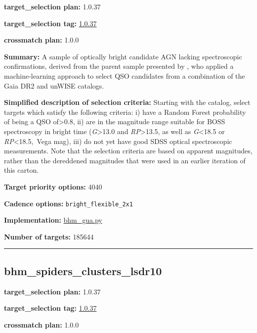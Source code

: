 \noindent\textbf{target\_selection plan:} 1.0.37

\noindent\textbf{target\_selection tag:}
\href{https://github.com/sdss/target_selection/tree/1.0.37/}{1.0.37}

\noindent\textbf{crossmatch plan:} 1.0.0

\noindent\textbf{Summary:} A sample of optically bright candidate AGN lacking
spectroscopic confirmations, derived from the parent sample presented by
\citet{Shu2019}, who applied a machine-learning approach to select QSO
candidates from a combination of the Gaia DR2 and unWISE catalogs.

\noindent\textbf{Simplified description of selection criteria:} Starting with the
\citet{Shu2019} catalog, select targets which satisfy the following
criteria: i) have a Random Forest probability of being a QSO
of\textgreater0.8, ii) are in the magnitude range suitable for BOSS
spectroscopy in bright time (\emph{G}\textgreater13.0 and
\emph{RP}\textgreater13.5, as well as \emph{G}\textless18.5 or
\emph{RP}\textless18.5,~Vega mag), iii) do not yet have good SDSS
optical spectroscopic measurements. Note that the selection criteria are
based on apparent magnitudes, rather than the dereddened magnitudes that
were used in an earlier iteration of this carton.


\noindent\textbf{Target priority options:} 4040

\noindent\textbf{Cadence options:} \texttt{bright\_flexible\_2x1}

\noindent\textbf{Implementation:}
\href{https://github.com/sdss/target_selection/blob/1.0.37/python/target_selection/cartons/bhm_gua.py}{bhm\_gua.py}

\noindent\textbf{Number of targets:} 185644

\begin{center}\rule{0.5\linewidth}{0.5pt}\end{center}

\hypertarget{bhm_spiders_clusters_lsdr10_plan1.0.37}{%
\subsection{bhm\_spiders\_clusters\_lsdr10}\label{bhm_spiders_clusters_lsdr10_plan1.0.37}}

\noindent\textbf{target\_selection plan:} 1.0.37

\noindent\textbf{target\_selection tag:}
\href{https://github.com/sdss/target_selection/tree/1.0.37/}{1.0.37}

\noindent\textbf{crossmatch plan:} 1.0.0

